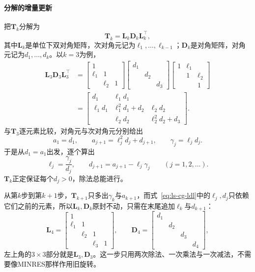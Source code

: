 \paragraph{分解的增量更新}
把$\bm T_k$分解为
\begin{equation}
 \bm T_k=\bm L_k\bm D_k\bm L_k^\top ,
 \label{eq:ls-cg-tridiagonal-ldl}
\end{equation}
其中$\bm L_k$是单位下双对角矩阵，次对角元记为$\ell_1,\ldots,\ell_{k-1}$；$\bm D_k$是对角矩阵，对角元记为$d_1,\ldots,d_k$。以$k=3$为例，
\[
 \begin{aligned}
 \bm L_3\bm D_3\bm L_3^\top
 &=\begin{bmatrix}1&&\\\ell_1&1&\\&\ell_2&1\end{bmatrix}
 \begin{bmatrix}d_1&&\\&d_2&\\&&d_3\end{bmatrix}
 \begin{bmatrix}1&\ell_1&\\&1&\ell_2\\&&1\end{bmatrix}\\
 &=\begin{bmatrix}d_1&\ell_1d_1&\\\ell_1d_1&\ell_1^2d_1+d_2&\ell_2d_2\\&\ell_2d_2&\ell_2^2d_2+d_3\end{bmatrix}.
 \end{aligned}
\]
与$\bm T_3$逐元素比较，对角元与次对角元分别给出
\[
 a_1=d_1,\qquad a_{j+1}=\ell_j^2d_j+d_{j+1},\qquad \gamma_j=\ell_jd_j .
\]
于是从$d_1=a_1$出发，逐个算出
\begin{equation}
 \ell_j=\frac{\gamma_j}{d_j},\qquad d_{j+1}=a_{j+1}-\ell_j\gamma_j\qquad(j=1,2,\ldots).
 \label{eq:ls-cg-ldl}
\end{equation}
$\bm T_k$正定保证每个$d_j>0$，除法总能进行。

从第$k$步到第$k+1$步，$\bm T_{k+1}$只多出$\gamma_k$与$a_{k+1}$，而式~\eqref{eq:ls-cg-ldl}中的$\ell_j,d_j$只依赖它们之前的元素，所以$\bm L_k,\bm D_k$原封不动，只需在末尾追加$\ell_k$与$d_{k+1}$：
\[
 \bm L_4=\begin{bmatrix}1&&&\\\ell_1&1&&\\&\ell_2&1&\\&&\ell_3&1\end{bmatrix},\qquad
 \bm D_4=\begin{bmatrix}d_1&&&\\&d_2&&\\&&d_3&\\&&&d_4\end{bmatrix},
\]
左上角的$3\times3$部分就是$\bm L_3,\bm D_3$。这一步只用两次除法、一次乘法与一次减法，不需要像MINRES那样作用旧旋转。

